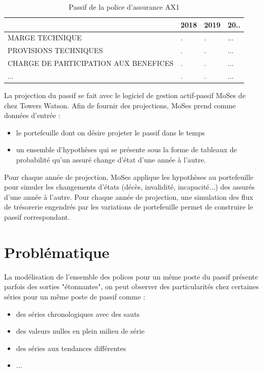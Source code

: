 
\begin{table}[H]
\centering
\caption{Passif de la police d'assurance \textsc{AX1}}
\label{my-label1}
\begin{tabular}{|l|l|l|l|}
\hline
    &  2018   &  2019   &  20..  \\ \hline
 MARGE TECHNIQUE   &  .   &   .  &  ...  \\ \hline
 PROVISIONS TECHNIQUES  &  .   &  .   &  ...  \\ \hline
 CHARGE DE PARTICIPATION AUX BENEFICES  &   .  &   .  &  ...  \\ \hline
  ...  &  .   &  .   &   ... \\ \hline
\end{tabular}
\end{table}

La projection du passif se fait avec le logiciel de gestion actif-passif MoSes de chez Towers Watson. Afin de fournir des projections, MoSes prend comme données d'entrée :

\begin{itemize}
\item le portefeuille dont on désire projeter le passif dans le temps
\item un ensemble d'hypothèses qui se présente sous la forme de tableaux de probabilité qu'un assuré change d'état d'une année à l'autre.
\end{itemize}

Pour chaque année de projection, MoSes applique les hypothèses au portefeuille pour simuler les changements d'états (décès, invalidité, incapacité...) des assurés d'une année à l'autre. Pour chaque année de projection, une simulation des flux de trésorerie engendrés par les variations de  portefeuille permet de construire le passif correspondant. 

\section{Problématique}

La modélisation de l'ensemble des polices pour un même poste du passif présente parfois des sorties "étonnantes", on peut observer des particularités chez certaines séries pour un même poste de passif comme : 

\begin{itemize}
\item des séries chronologiques avec des sauts
\item des valeurs nulles en plein milieu de série
\item des séries aux tendances différentes 
\item ...
\end{itemize}

